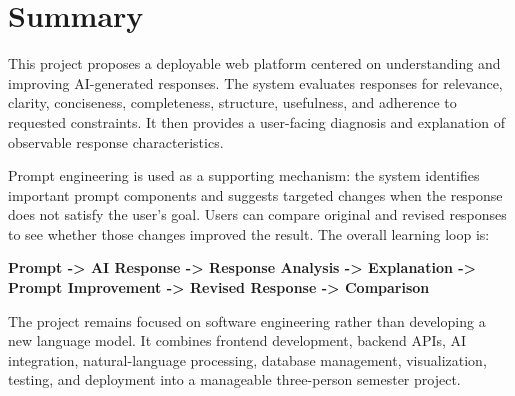 \documentclass[11pt,a4paper]{article}
\begin{document}
\section{Summary}

This project proposes a deployable web platform centered on understanding
and improving AI-generated responses. The system evaluates responses for
relevance, clarity, conciseness, completeness, structure, usefulness, and
adherence to requested constraints. It then provides a user-facing diagnosis
and explanation of observable response characteristics.

Prompt engineering is used as a supporting mechanism: the system identifies
important prompt components and suggests targeted changes when the response
does not satisfy the user's goal. Users can compare original and revised
responses to see whether those changes improved the result. The overall
learning loop is:

\textbf{Prompt -> AI Response -> Response Analysis -> Explanation ->
Prompt Improvement -> Revised Response -> Comparison}

The project remains focused on software engineering rather than developing a
new language model. It combines frontend development, backend APIs, AI
integration, natural-language processing, database management, visualization,
testing, and deployment into a manageable three-person semester project.
\end{document}

